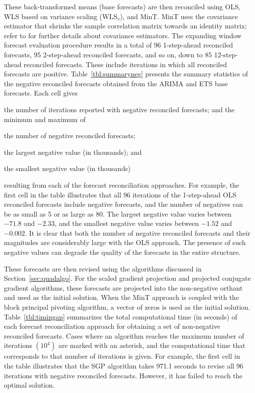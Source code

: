 \documentclass[11pt]{article}
\newcommand{\0}{\phantom{0}}
\begin{document}
These back-transformed means (base forecasts) are then reconciled using OLS, WLS based on variance scaling (WLS$_{v}$), and MinT. MinT uses the covariance estimator that shrinks the sample correlation matrix towards an identity matrix; refer to \citet{Wick2018} for further details about covariance estimators. The expanding window forecast evaluation procedure results in a total of 96 1-step-ahead reconciled forecasts, 95 2-step-ahead reconciled forecasts, and so on, down to 85 12-step-ahead reconciled forecasts. These include iterations in which all reconciled forecasts are positive. Table~\ref{tbl:summaryneg} presents the summary statistics of the negative reconciled forecasts obtained from the ARIMA and ETS base forecasts. Each cell gives \begin{inparaenum}[(i)] \item the number of iterations reported with negative reconciled forecasts; and the minimum and maximum of \item the number of negative reconciled forecasts; \item the largest negative value (in thousands); and \item the smallest negative value (in thousands) \end{inparaenum} resulting from each of the forecast reconciliation approaches. For example, the first cell in the table illustrates that all 96 iterations of the 1-step-ahead OLS reconciled forecasts include negative forecasts, and the number of negatives can be as small as 5 or as large as 80. The largest negative value varies between $-71.8$ and $-2.33$, and the smallest negative value varies between $-1.52$ and $-0.002$. It is clear that both the number of negative reconciled forecasts and their magnitudes are considerably large with the OLS approach. The presence of such negative values can degrade the quality of the forecasts in the entire structure.

These forecasts are then revised using the algorithms discussed in Section~\ref{sec:quadalgo}. For the scaled gradient projection and projected conjugate gradient algorithms, these forecasts are projected into the non-negative orthant and used as the initial solution. When the MinT approach is coupled with the block principal pivoting algorithm, a vector of zeros is used as the initial solution. Table~\ref{tbl:timingap} summarizes the total computational time (in seconds) of each forecast reconciliation approach for obtaining a set of non-negative reconciled forecasts. Cases where an algorithm reaches the maximum number of iterations $(10^{4})$ are marked with an asterisk, and the computational time that corresponds to that number of iterations is given. For example, the first cell in the table illustrates that the SGP algorithm takes 971.1 seconds to revise all 96 iterations with negative reconciled forecasts. However, it has failed to reach the optimal solution.
\end{document}
